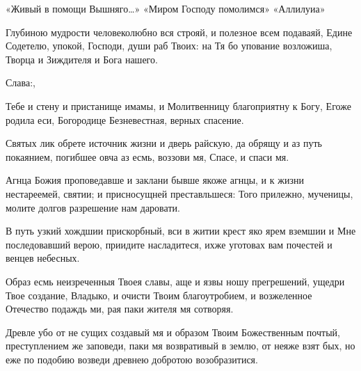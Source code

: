 \begin{mymulticols}
 

 «Живый в помощи Вышняго…»  «Миром Господу помолимся»  «Аллилуиа» 


Глубиною мудрости человеколюбно вся строяй, и полезное всем подаваяй, Едине Содетелю, упокой, Господи, души раб Твоих: на Тя бо упование возложиша, Творца и Зиждителя и Бога нашего. 

Слава:, \inynen

 Тебе и стену и пристанище имамы, и Молитвенницу благоприятну к Богу, Егоже родила еси, Богородице Безневестная, верных спасение.



Святых лик обрете источник жизни и дверь райскую, да обрящу и аз путь покаянием, погибшее овча аз есмь, воззови мя, Спасе, и спаси мя. 


Агнца Божия проповедавше и заклани бывше якоже агнцы, и к жизни нестареемей, святии; и присносущней преставльшеся: Того прилежно, мученицы, молите долгов разрешение нам даровати. 


В путь узкий хождшии прискорбный, вси в житии крест яко ярем вземшии и Мне последовавший верою, приидите насладитеся, ихже уготовах вам почестей и венцев небесных. 


Образ есмь неизреченныя Твоея славы, аще и язвы ношу прегрешений, ущедри Твое создание, Владыко, и очисти Твоим благоутробием, и возжеленное Отечество подаждь ми, рая паки жителя мя сотворяя. 


Древле убо от не сущих создавый мя и образом Твоим Божественным почтый, преступлением же заповеди, паки мя возвративый в землю, от неяже взят бых, но еже по подобию возведи древнею добротою возобразитися. 


\end{mymulticols}
